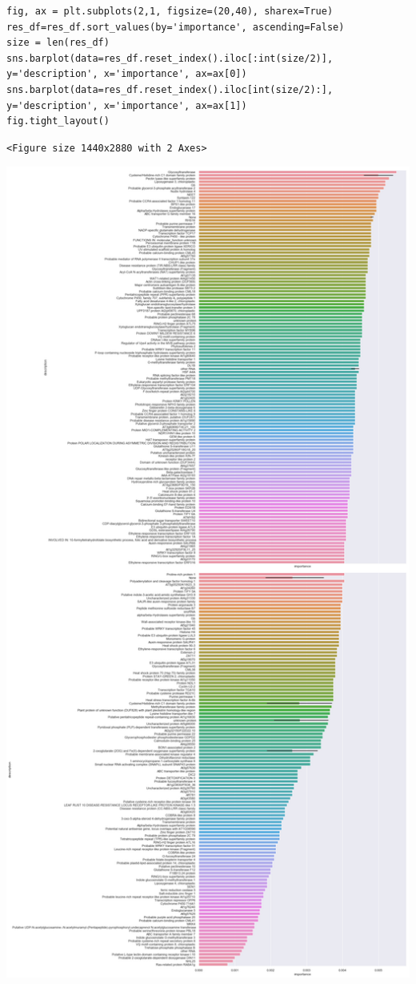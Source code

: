 \documentclass[11pt]{article}
\begin{document}
\begin{verbatim}
fig, ax = plt.subplots(2,1, figsize=(20,40), sharex=True)
res_df=res_df.sort_values(by='importance', ascending=False)
size = len(res_df)
sns.barplot(data=res_df.reset_index().iloc[:int(size/2)], y='description', x='importance', ax=ax[0])
sns.barplot(data=res_df.reset_index().iloc[int(size/2):], y='description', x='importance', ax=ax[1])
fig.tight_layout()
\end{verbatim}

\begin{verbatim}
<Figure size 1440x2880 with 2 Axes>
\end{verbatim}


\begin{center}
\includegraphics[width=.9\linewidth]{obipy-resources/93e2fbf76ed477962282ae99767b8408de4d3ed9/86df1a6105cefefdce9f5d320820d0043bf1133c.png}
\end{center}
\end{document}
